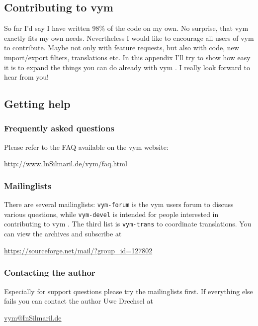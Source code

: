 \documentclass[12pt,a4paper]{article}
\newcommand{\vym}{{\sc vym }}
\begin{document}
\begin{appendix}
\section{Contributing to \vym}
So far I'd say I have written 98\% of the code on my own. No surprise,
that \vym exactly fits my own needs. Nevertheless I would like to
encourage all users of  \vym to contribute. Maybe not only with feature
requests, but also with code, new import/export filters, translations
etc. In this appendix I'll try to show how easy it is to expand the
things you can do already with \vym. I really look forward to hear from
you!

\subsection{Getting help}

\subsubsection*{Frequently asked questions}
Please refer to the FAQ available on the \vym website:
\begin{center}
\href{http://www.InSilmaril.de/vym/faq.html}{http://www.InSilmaril.de/vym/faq.html}
\end{center}

\subsubsection*{Mailinglists}
There are several mailinglists: {\tt vym-forum} is the \vym users forum to
discuss various questions, while {\tt vym-devel} is intended for people
interested in contributing to \vym. The third list is {\tt vym-trans} to
coordinate translations. You can view the archives and subscribe at
\begin{center}
\href{https://sourceforge.net/mail/?group_id=127802}{https://sourceforge.net/mail/?group\_id=127802}
\end{center}

\subsubsection*{Contacting the author}\label{author}
Especially for support questions please try the mailinglists first. If
everything else fails you can contact the author Uwe Drechsel at
\begin{center}
\href{mailto:vym@InSilmaril.de}{vym@InSilmaril.de}
\end{center}




\end{appendix}
\end{document}

